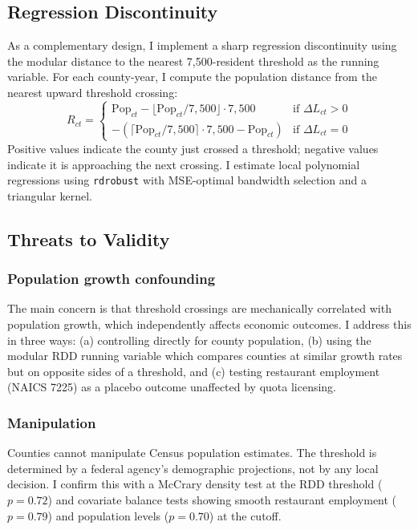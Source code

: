 \documentclass[12pt]{article}
\begin{document}
\subsection{Regression Discontinuity}

As a complementary design, I implement a sharp regression discontinuity using the modular distance to the nearest 7,500-resident threshold as the running variable. For each county-year, I compute the population distance from the nearest upward threshold crossing:
\begin{equation}
R_{ct} = \begin{cases}
\text{Pop}_{ct} - \lfloor \text{Pop}_{ct} / 7{,}500 \rfloor \cdot 7{,}500 & \text{if } \Delta L_{ct} > 0 \\
-(\lceil \text{Pop}_{ct} / 7{,}500 \rceil \cdot 7{,}500 - \text{Pop}_{ct}) & \text{if } \Delta L_{ct} = 0
\end{cases}
\end{equation}
Positive values indicate the county just crossed a threshold; negative values indicate it is approaching the next crossing. I estimate local polynomial regressions using \texttt{rdrobust} \citep{cattaneo2020practical} with MSE-optimal bandwidth selection and a triangular kernel.

\subsection{Threats to Validity}

\subsubsection*{Population growth confounding} The main concern is that threshold crossings are mechanically correlated with population growth, which independently affects economic outcomes. I address this in three ways: (a) controlling directly for county population, (b) using the modular RDD running variable which compares counties at similar growth rates but on opposite sides of a threshold, and (c) testing restaurant employment (NAICS 7225) as a placebo outcome unaffected by quota licensing.

\subsubsection*{Manipulation} Counties cannot manipulate Census population estimates. The threshold is determined by a federal agency's demographic projections, not by any local decision. I confirm this with a McCrary density test at the RDD threshold ($p = 0.72$) and covariate balance tests showing smooth restaurant employment ($p = 0.79$) and population levels ($p = 0.70$) at the cutoff.
\end{document}
